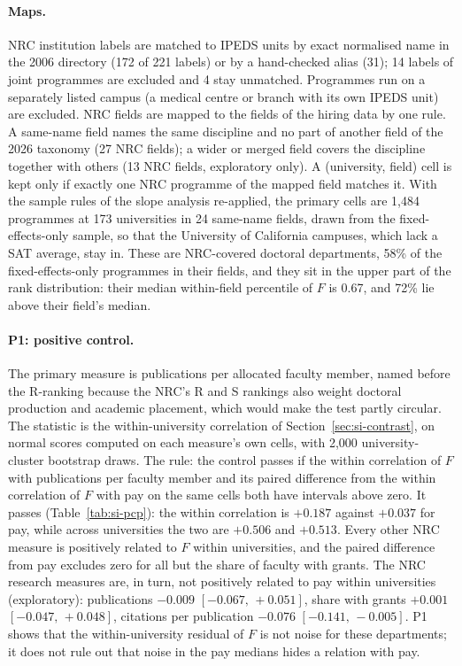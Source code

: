 \documentclass[11pt]{article}
\newcommand{\ci}[2]{$[#1,\allowbreak\,#2]$}
\begin{document}
\paragraph{Maps.} NRC institution labels are matched to IPEDS units by exact normalised name in the 2006 directory
(172 of 221 labels) or by a hand-checked alias (31); 14 labels of joint programmes are excluded and 4 stay unmatched.
Programmes run on a separately listed campus (a medical centre or branch with its own IPEDS unit) are excluded. NRC
fields are mapped to the fields of the hiring data by one rule. A same-name field names the same discipline and no
part of another field of the 2026 taxonomy (27 NRC fields); a wider or merged field covers the discipline together with
others (13 NRC fields, exploratory only). A (university, field) cell is kept only if exactly one NRC programme of the
mapped field matches it. With the sample rules of the slope analysis re-applied, the primary cells are 1,484
programmes at 173
universities in 24 same-name fields, drawn from the fixed-effects-only sample, so that the University of California
campuses, which lack a SAT average, stay in. These are NRC-covered doctoral departments, 58\% of the fixed-effects-only
programmes in their fields, and they sit in the upper part of the rank distribution: their median within-field
percentile of $F$ is 0.67, and 72\% lie above their field's median.

\paragraph{P1: positive control.} The primary measure is publications per allocated faculty member, named before the
R-ranking because the NRC's R and S rankings also weight doctoral production and academic placement, which would make
the test partly circular. The statistic is the within-university correlation of Section~\ref{sec:si-contrast}, on
normal scores computed on each measure's own cells, with 2,000 university-cluster bootstrap draws. The rule: the
control passes if the within correlation of $F$ with publications per faculty member and its paired difference from
the within correlation of $F$ with pay on the same cells both have intervals above zero. It passes
(Table~\ref{tab:si-pcp}): the within correlation is $+0.187$ against $+0.037$ for pay, while across universities the
two are $+0.506$ and $+0.513$. Every other NRC measure is positively related to $F$ within universities, and the
paired difference from pay excludes zero for all but the share of faculty with grants. The NRC research measures are,
in turn, not positively related to pay within universities (exploratory): publications $-0.009$ \ci{-0.067}{+0.051},
share with grants $+0.001$ \ci{-0.047}{+0.048}, citations per publication $-0.076$ \ci{-0.141}{-0.005}. P1 shows that
the within-university residual of $F$ is not noise for these departments; it does not rule out that noise in the pay
medians hides a relation with pay.
\end{document}
